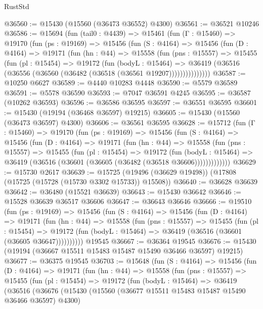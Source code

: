 \begin{lexlean}{RustStd}
\begin{coremodule}
@36560 := @15430 (@15560 (@36473 @36552) @4300)
@36561 := @36521 @10246
@36586 := @15694
    (fun (tail0 : @4439) =>
    @15461
      (fun (Γ : @15460) =>
      @19170
        (fun (ps : @19169) =>
        @15456
          (fun (S : @4164) =>
          @15456
            (fun (D : @4164) =>
            @19171
              (fun (hn : @44) =>
              @15558
                (fun (pns : @15557) =>
                @15455
                  (fun (pl : @15454) =>
                  @19172
                    (fun (bodyL : @15464) =>
                    @36419 (@36516 (@36556 (@36560 (@36482 (@36518 (@36561 @19207)))))))))))))))
@36587 := @10250 @6627
@36589 := @4440 @10283 @4448
@36590 := @5579 @36589
@36591 := @5578 @36590
@36593 := @7047 @36591 @4245
@36595 := @36587 (@10262 @36593)
@36596 := @36586 @36595
@36597 := @36551 @36595
@36601 := @15430 (@19194 (@36468 @36597) @19215)
@36605 := @15430 (@15560 (@36473 @36597) @4300)
@36606 := @36561 @36595
@36628 := @15712
    (fun (Γ : @15460) =>
    @19170
      (fun (ps : @19169) =>
      @15456
        (fun (S : @4164) =>
        @15456
          (fun (D : @4164) =>
          @19171
            (fun (hn : @44) =>
            @15558
              (fun (pns : @15557) =>
              @15455
                (fun (pl : @15454) =>
                @19172
                  (fun (bodyL : @15464) =>
                  @36419 (@36516 (@36601 (@36605 (@36482 (@36518 @36606)))))))))))))
@36629 := @15730 @2617
@36639 := @15725 (@19496 (@36629 @19498)) (@17808 (@15725 (@15728 (@15730 @3302 @15733)) @15508))
@36640 := @36628 @36639
@36642 := @36480 (@15521 @36639)
@36643 := @15430 @36642
@36646 := @15528 @36639 @36517 @36606
@36647 := @36643 @36646
@36666 := @19510
    (fun (ps : @19169) =>
    @15456
      (fun (S : @4164) =>
      @15456
        (fun (D : @4164) =>
        @19171
          (fun (hn : @44) =>
          @15558
            (fun (pns : @15557) =>
            @15455
              (fun (pl : @15454) =>
              @19172 (fun (bodyL : @15464) => @36419 (@36516 (@36601 (@36605 @36647))))))))))
    @19545
@36667 := @36364 @19545
@36676 := @15430 (@19194 (@36667 @15511 @15483 @15487 @15490 @36466 @36597) @19215)
@36677 := @36375 @19545
@36703 := @15648
    (fun (S : @4164) =>
    @15456
      (fun (D : @4164) =>
      @19171
        (fun (hn : @44) =>
        @15558
          (fun (pns : @15557) =>
          @15455
            (fun (pl : @15454) =>
            @19172
              (fun (bodyL : @15464) =>
              @36419
                (@36516
                  (@36676
                    (@15430
                      (@15560 (@36677 @15511 @15483 @15487 @15490 @36466 @36597) @4300)

\end{coremodule}
\end{lexlean}

